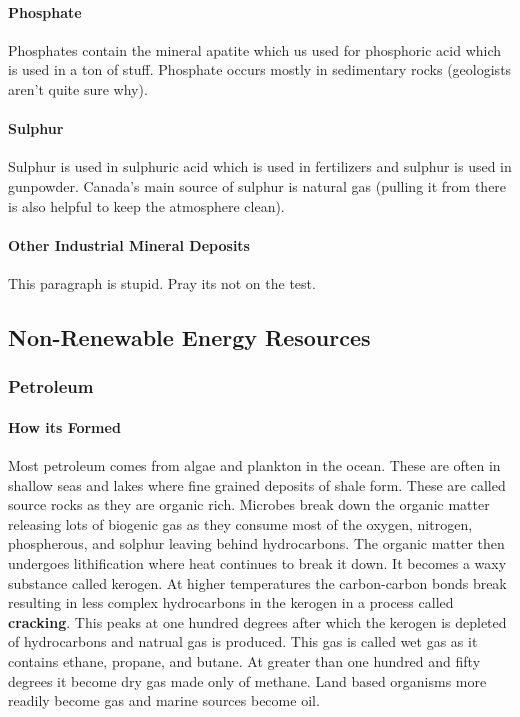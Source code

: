 \documentclass{article}
\begin{document}
\paragraph{Phosphate} %
\label{par:phosphate}
Phosphates contain the mineral apatite which us used for phosphoric acid which is used in a ton of stuff. Phosphate occurs mostly in sedimentary rocks (geologists aren't quite sure why).

\paragraph{Sulphur} %
\label{par:sulphur}
Sulphur is used in sulphuric acid which is used in fertilizers and sulphur is used in gunpowder. Canada's main source of sulphur is natural gas (pulling it from there is also helpful to keep the atmosphere clean).

\paragraph{Other Industrial Mineral Deposits} %
\label{par:other_industrial_mineral_deposits}
This paragraph is stupid. Pray its not on the test.


\subsection{Non-Renewable Energy Resources} %
\label{sub:non_renewable_energy_resources}

\subsubsection{Petroleum} %
\label{sub:petroleum}

\paragraph{How its Formed} %
\label{par:how_its_formed}
Most petroleum comes from algae and plankton in the ocean. These are often in shallow seas and lakes where fine grained deposits of shale form. These are called source rocks as they are organic rich. Microbes break down the organic matter releasing lots of biogenic gas as they consume most of the oxygen, nitrogen, phospherous, and solphur leaving behind hydrocarbons. The organic matter then undergoes lithification where heat continues to break it down. It becomes a waxy substance called kerogen. At higher temperatures the carbon-carbon bonds break resulting in less complex hydrocarbons in the kerogen in a process called \textbf{cracking}. This peaks at one hundred degrees after which the kerogen is depleted of hydrocarbons and natrual gas is produced. This gas is called wet gas as it contains ethane, propane, and butane. At greater than one hundred and fifty degrees it become dry gas made only of methane. Land based organisms more readily become gas and marine sources become oil.
\end{document}
